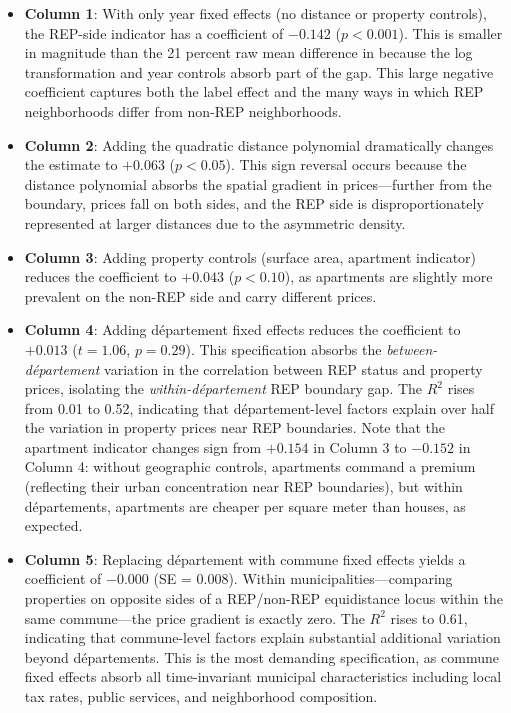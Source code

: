 \documentclass[12pt]{article}
\begin{document}
\begin{itemize}
\item \textbf{Column 1}: With only year fixed effects (no distance or property controls), the REP-side indicator has a coefficient of $-0.142$ ($p < 0.001$). This is smaller in magnitude than the 21 percent raw mean difference in  because the log transformation and year controls absorb part of the gap. This large negative coefficient captures both the label effect and the many ways in which REP neighborhoods differ from non-REP neighborhoods.

\item \textbf{Column 2}: Adding the quadratic distance polynomial dramatically changes the estimate to $+0.063$ ($p < 0.05$). This sign reversal occurs because the distance polynomial absorbs the spatial gradient in prices---further from the boundary, prices fall on both sides, and the REP side is disproportionately represented at larger distances due to the asymmetric density.

\item \textbf{Column 3}: Adding property controls (surface area, apartment indicator) reduces the coefficient to $+0.043$ ($p < 0.10$), as apartments are slightly more prevalent on the non-REP side and carry different prices.

\item \textbf{Column 4}: Adding d\'{e}partement fixed effects reduces the coefficient to $+0.013$ ($t = 1.06$, $p = 0.29$). This specification absorbs the \textit{between-d\'{e}partement} variation in the correlation between REP status and property prices, isolating the \textit{within-d\'{e}partement} REP boundary gap. The $R^2$ rises from 0.01 to 0.52, indicating that d\'{e}partement-level factors explain over half the variation in property prices near REP boundaries. Note that the apartment indicator changes sign from $+0.154$ in Column 3 to $-0.152$ in Column 4: without geographic controls, apartments command a premium (reflecting their urban concentration near REP boundaries), but within d\'{e}partements, apartments are cheaper per square meter than houses, as expected.

\item \textbf{Column 5}: Replacing d\'{e}partement with commune fixed effects yields a coefficient of $-0.000$ (SE = 0.008). Within municipalities---comparing properties on opposite sides of a REP/non-REP equidistance locus within the same commune---the price gradient is exactly zero. The $R^2$ rises to 0.61, indicating that commune-level factors explain substantial additional variation beyond d\'{e}partements. This is the most demanding specification, as commune fixed effects absorb all time-invariant municipal characteristics including local tax rates, public services, and neighborhood composition.
\end{itemize}
\end{document}
